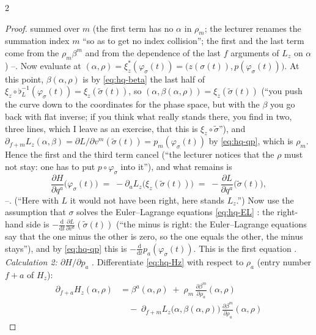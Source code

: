 \begin{paracol}{2}
\begin{proof}
summed over $m$ (the first term has no $\alpha$ in $\rho_m$; the lecturer renames the summation index $m$ ``so as to get no index collision''; the first and the last term come from the $\rho_m\beta^m$ and from the dependence of the last $f$ arguments of $L_z$ on $\alpha$) --. Now evaluate at $(\alpha,\rho)=\xi^*_z(\varphi_\sigma(t))=\bigl(z(\sigma(t)),p(\varphi_\sigma(t))\bigr)$. At this point, $\beta(\alpha,\rho)$ is by \eqref{eq:hq-beta} the last half of $\xi_z\circ\flat_L^{-1}(\varphi_\sigma(t))=\xi_z(\tilde\sigma(t))$, so $(\alpha,\beta(\alpha,\rho))=\xi_z(\tilde\sigma(t))$ (``you push the curve down to the coordinates for the phase space, but with the $\beta$ you go back with flat inverse; if you think what really stands there, you find in two, three lines, which I leave as an exercise, that this is $\xi_z\circ\tilde\sigma$''), and $\partial_{f+m}L_z(\alpha,\beta)=\partial L/\partial v^m(\tilde\sigma(t))=p_m(\varphi_\sigma(t))$ by \eqref{eq:hq-qp}, which is $\rho_m$. Hence the first and the third term cancel (``the lecturer notices that the $\rho$ must not stay: one has to put $p\circ\varphi_\sigma$ into it''), and what remains is
\[
  \frac{\partial H}{\partial q^a}\bigl(\varphi_\sigma(t)\bigr)\;=\;-\partial_aL_z\bigl(\xi_z(\tilde\sigma(t))\bigr)\;=\;-\frac{\partial L}{\partial q^a}\bigl(\tilde\sigma(t)\bigr),
\]
--. (``Here with $L$ it would not have been right, here stands $L_z$.'') Now use the assumption that $\sigma$ solves the Euler--Lagrange equations \eqref{eq:hq-EL} : the right-hand side is $-\frac{\mathrm d}{\mathrm dt}\frac{\partial L}{\partial v^a}(\tilde\sigma(t))$ (``the minus is right: the Euler--Lagrange equations say that the one minus the other is zero, so the one equals the other, the minus stays''), and by \eqref{eq:hq-qp} this is $-\frac{\mathrm d}{\mathrm dt}p_a(\varphi_\sigma(t))$. This is the first equation .\\
\emph{Calculation 2: $\partial H/\partial p_a$} . Differentiate \eqref{eq:hq-Hz} with respect to $\rho_a$ (entry number $f+a$ of $H_z$):
\[
  \begin{aligned}
  \partial_{f+a}H_z(\alpha,\rho)&=\beta^a(\alpha,\rho)\;+\;\rho_m\,\frac{\partial\beta^m}{\partial\rho_a}(\alpha,\rho)\\
  &\quad-\;\partial_{f+m}L_z\bigl(\alpha,\beta(\alpha,\rho)\bigr)\,\frac{\partial\beta^m}{\partial\rho_a}(\alpha,\rho)
  \end{aligned}
\]

\end{proof}
\end{paracol}
